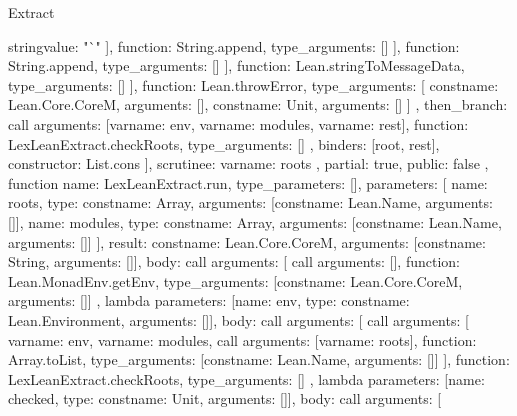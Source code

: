 \begin{lexlean}{Extract}
\begin{toolingmodule}
{{{{{{{{{                              string{value: "`"}
                            ],
                            function: String.append,
                            type_arguments: []
                          }
                        ],
                        function: String.append,
                        type_arguments: []
                      }
                    ],
                    function: Lean.stringToMessageData,
                    type_arguments: []
                  }
                ],
                function: Lean.throwError,
                type_arguments: [
                  const{name: Lean.Core.CoreM, arguments: []},
                  const{name: Unit, arguments: []}
                ]
              },
              then_branch: call{
                arguments: [var{name: env}, var{name: modules}, var{name: rest}],
                function: LexLeanExtract.checkRoots,
                type_arguments: []
              }
            },
            binders: [root, rest],
            constructor: List.cons
          }
        ],
        scrutinee: var{name: roots}
      },
      partial: true,
      public: false
    },
    function{
      name: LexLeanExtract.run,
      type_parameters: [],
      parameters: [
        {name: roots, type: const{name: Array, arguments: [const{name: Lean.Name, arguments: []}]}},
        {
          name: modules,
          type: const{name: Array, arguments: [const{name: Lean.Name, arguments: []}]}
        }
      ],
      result: const{name: Lean.Core.CoreM, arguments: [const{name: String, arguments: []}]},
      body: call{
        arguments: [
          call{
            arguments: [],
            function: Lean.MonadEnv.getEnv,
            type_arguments: [const{name: Lean.Core.CoreM, arguments: []}]
          },
          lambda{
            parameters: [{name: env, type: const{name: Lean.Environment, arguments: []}}],
            body: call{
              arguments: [
                call{
                  arguments: [
                    var{name: env},
                    var{name: modules},
                    call{
                      arguments: [var{name: roots}],
                      function: Array.toList,
                      type_arguments: [const{name: Lean.Name, arguments: []}]
                    }
                  ],
                  function: LexLeanExtract.checkRoots,
                  type_arguments: []
                },
                lambda{
                  parameters: [{name: checked, type: const{name: Unit, arguments: []}}],
                  body: call{
                    arguments: [
}}}}}}}
\end{toolingmodule}
\end{lexlean}
